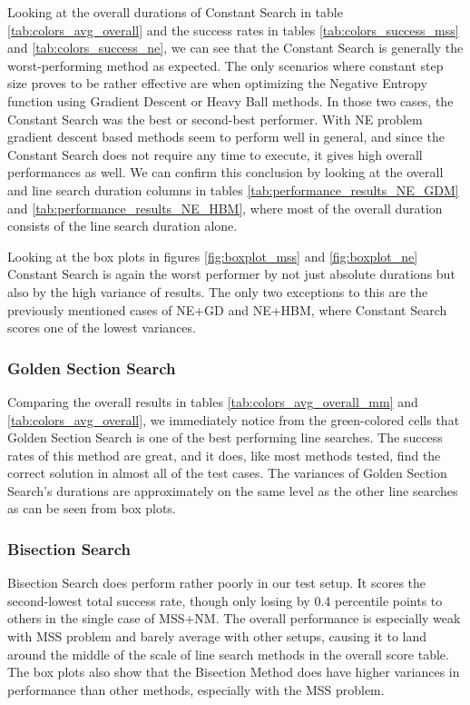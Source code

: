 \documentclass[a4paper,english,titlepage,12pt]{article}
\begin{document}
Looking at the overall durations of Constant Search in table \ref{tab:colors_avg_overall} and the success rates in tables \ref{tab:colors_success_mss} and \ref{tab:colors_success_ne}, we can see that the Constant Search is generally the worst-performing method as expected. The only scenarios where constant step size proves to be rather effective are when optimizing the Negative Entropy function using Gradient Descent or Heavy Ball methods. In those two cases, the Constant Search was the best or second-best performer. With NE problem gradient descent based methods seem to perform well in general, and since the Constant Search does not require any time to execute, it gives high overall performances as well. We can confirm this conclusion by looking at the overall and line search duration columns in tables \ref{tab:performance_results_NE_GDM} and \ref{tab:performance_results_NE_HBM}, where most of the overall duration consists of the line search duration alone.

Looking at the box plots in figures \ref{fig:boxplot_mss} and \ref{fig:boxplot_ne} Constant Search is again the worst performer by not just absolute durations but also by the high variance of results. The only two exceptions to this are the previously mentioned cases of NE+GD and NE+HBM, where Constant Search scores one of the lowest variances.

\subsubsection*{Golden Section Search}

Comparing the overall results in tables \ref{tab:colors_avg_overall_mm} and \ref{tab:colors_avg_overall}, we immediately notice from the green-colored cells that Golden Section Search is one of the best performing line searches. The success rates of this method are great, and it does, like most methods tested, find the correct solution in almost all of the test cases. The variances of Golden Section Search's durations are approximately on the same level as the other line searches as can be seen from box plots.

\subsubsection*{Bisection Search}

Bisection Search does perform rather poorly in our test setup. It scores the second-lowest total success rate, though only losing by 0.4 percentile points to others in the single case of MSS+NM. The overall performance is especially weak with MSS problem and barely average with other setups, causing it to land around the middle of the scale of line search methods in the overall score table. The box plots also show that the Bisection Method does have higher variances in performance than other methods, especially with the MSS problem.
\end{document}

